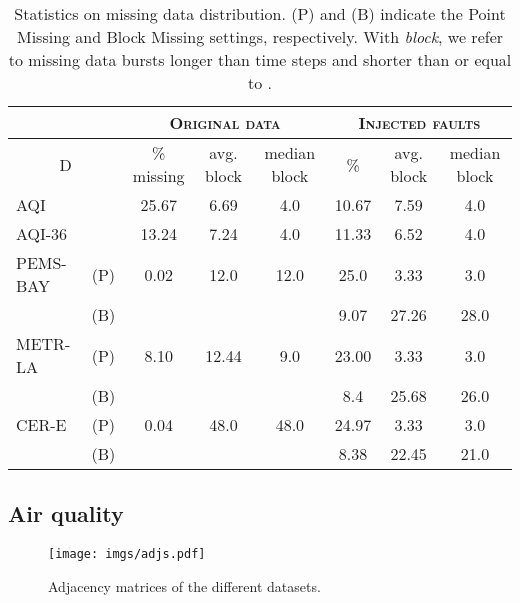 \documentclass{article} \usepackage{iclr2022_conference,times}
\begin{document}
\begin{table}[ht]
\vspace{-0.2cm}
\caption{Statistics on missing data distribution. (P) and (B) indicate the Point Missing and Block Missing settings, respectively. With \emph{block}, we refer to missing data bursts longer than  time steps and shorter than or equal to .}
\vspace{0.1cm}
\centering  
\begin{adjustbox}{max width=\textwidth}
\begin{tabular}{ l  c |c c c | c c c}
\toprule
 \multicolumn{2}{c}{}&\multicolumn{3}{c}{\textsc{Original data}} & \multicolumn{3}{c}{\textsc{Injected faults}} \\
\midrule
\multicolumn{2}{c|}{D} & \% missing & avg. block & median block & \%  &avg. block & median block \\
\midrule
AQI & &25.67 & 6.69 & 4.0 & 10.67 & 7.59 & 4.0 \\
\midrule
AQI-36 & &13.24 & 7.24 & 4.0 & 11.33 & 6.52 & 4.0 \\
\midrule
PEMS-BAY & (P) & 0.02 & 12.0 & 12.0 & 25.0 & 3.33 & 3.0 \\
& (B) &  &  &  & 9.07 & 27.26 & 28.0 \\
\midrule
METR-LA & (P) & 8.10 & 12.44 & 9.0 & 23.00 & 3.33 & 3.0\\
& (B) &  &  &  & 8.4 & 25.68 & 26.0\\
\midrule
CER-E &(P) & 0.04 & 48.0 & 48.0 & 24.97 & 3.33 & 3.0 \\
&(B) &  &  &  & 8.38 & 22.45 & 21.0 \\
\bottomrule
\end{tabular}
\end{adjustbox}
\label{tab:missing}
\end{table} 
\subsection{Air quality} \label{a:air}

\begin{figure}
    \centering
    \texttt{[image: imgs/adjs.pdf]}
    \caption{Adjacency matrices of the different datasets.}
    \label{fig:adjs}
\end{figure}
\end{document}

